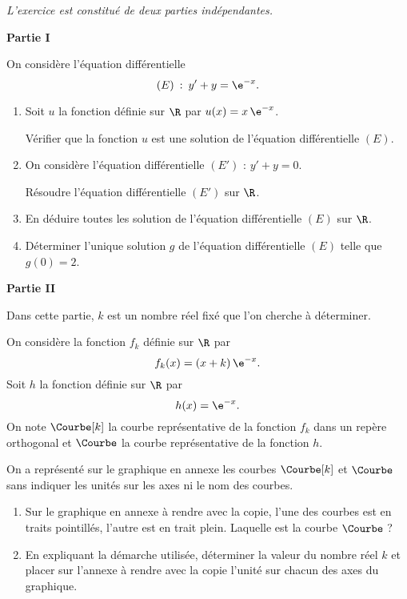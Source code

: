 \emph{L’exercice est constitué de deux parties indépendantes.}

\medskip

\textbf{\large Partie I}

\medskip

On considère l’équation différentielle \[ (E) \: : \: y'+y=\e^{-x}. \]

\begin{enumerate}
	\item Soit $u$ la fonction définie sur $\R$ par $u(x) = x\,\e^{-x}$.
	
	Vérifier que la fonction $u$ est une solution de l’équation différentielle $(E)$.
	\item On considère l’équation différentielle $(E')$ : $y'+y=0$.
	
	Résoudre l’équation différentielle $(E')$ sur $\R$.
	\item En déduire toutes les solution de l’équation différentielle $(E)$ sur $\R$.
	\item Déterminer l’unique solution $g$ de l’équation différentielle $(E)$ telle que $g(0)=2$.
\end{enumerate}

\medskip

\textbf{\large Partie II}

\medskip

Dans cette partie, $k$ est un nombre réel fixé que l’on cherche à déterminer.

On considère la fonction $f_k$ définie sur $\R$ par \[ f_k(x)=(x+k)\,\e^{-x}. \]
%
Soit $h$ la fonction définie sur $\R$ par \[ h(x)=\e^{-x}. \]
%
On note $\Courbe[k]$ la courbe représentative de la fonction $f_k$ dans un repère orthogonal et $\Courbe$ la courbe représentative de la fonction $h$.

On a représenté sur le graphique en annexe les courbes $\Courbe[k]$ et $\Courbe$ sans indiquer les unités sur les axes ni le nom des courbes.

\begin{enumerate}
	\item Sur le graphique en annexe à rendre avec la copie, l’une des courbes est en traits pointillés, l’autre est en trait plein. Laquelle est la courbe $\Courbe$ ?
	\item En expliquant la démarche utilisée, déterminer la valeur du nombre réel $k$ et placer sur l’annexe à rendre avec la copie l’unité sur chacun des axes du graphique.
\end{enumerate}